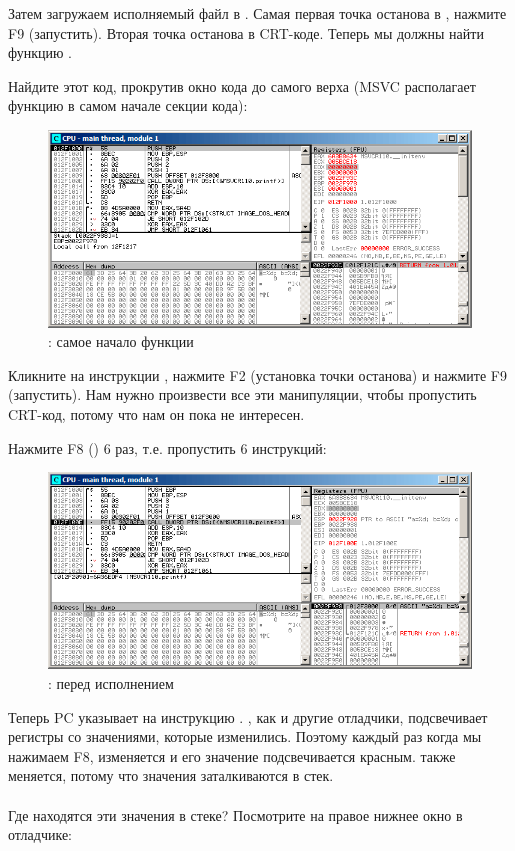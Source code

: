 Затем загружаем исполняемый файл в \olly.
Самая первая точка останова в , нажмите F9 (запустить).
Вторая точка останова в \ac{CRT}-коде.
Теперь мы должны найти функцию \main.

Найдите этот код, прокрутив окно кода до самого верха (MSVC располагает функцию \main в самом начале секции кода): 

\begin{figure}[H]
\centering
\includegraphics[scale=\FigScale]{patterns/03_printf/x86/olly3_1.png}
\caption{\olly: самое начало функции \main}
\label{fig:printf3_olly_1}
\end{figure}

Кликните на инструкции , нажмите F2 (установка точки останова) и нажмите F9 (запустить).
Нам нужно произвести все эти манипуляции, чтобы пропустить \ac{CRT}-код, потому что нам он пока
не интересен.

\clearpage
Нажмите F8 (\stepover) 6 раз, т.е. пропустить 6 инструкций:

\begin{figure}[H]
\centering
\includegraphics[scale=\FigScale]{patterns/03_printf/x86/olly3_2.png}
\caption{\olly: перед исполнением \printf}
\label{fig:printf3_olly_2}
\end{figure}

Теперь \ac{PC} указывает на инструкцию .
\olly, как и другие отладчики, подсвечивает регистры со значениями, которые изменились.
Поэтому каждый раз когда мы нажимаем F8, \EIP изменяется и его значение подсвечивается красным.
\ESP также меняется, потому что значения заталкиваются в стек.\\
\\
Где находятся эти значения в стеке?
Посмотрите на правое нижнее окно в отладчике:

